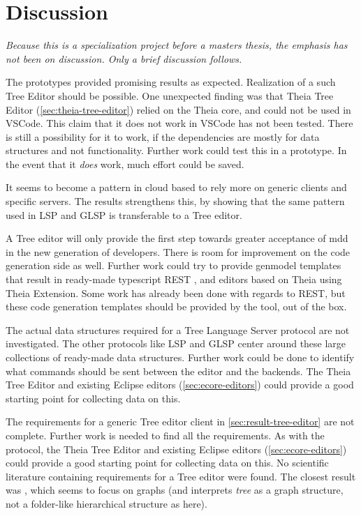 \chapter{Discussion}


\emph{Because this is a specialization project before a masters thesis, the emphasis has not been on discussion. Only a brief discussion follows.}

\par
The prototypes provided promising results as expected.
Realization of a such Tree Editor should be possible.
One unexpected finding was that Theia Tree Editor (\cref{sec:theia-tree-editor}) relied on the Theia core, and could not be used in VSCode.
This claim that it does not work in VSCode has not been tested.
There is still a possibility for it to work, if the dependencies are mostly for data structures and not functionality.
Further work could test this in a prototype.
In the event that it \emph{does} work, much effort could be saved.

\par
It seems to become a pattern in \gls{cloud} based  to rely more on generic clients and specific servers.
The results strengthens this, by showing that the same pattern used in \gls{LSP} and \gls{GLSP} is transferable to a Tree editor.

\par
A Tree editor will only provide the first step towards greater acceptance of \gls{mdd} in the new generation of developers.
There is room for improvement on the code generation side as well.
Further work could try to provide genmodel templates that result in ready-made typescript \gls{REST} , and editors based on Theia using Theia Extension.
Some work has already been done with regards to \gls{REST}, but these code generation templates should be provided by the tool, out of the box.

\par
The actual data structures required for a Tree Language Server protocol are not investigated.
The other protocols like \gls{LSP} and \gls{GLSP} center around these large collections of ready-made data structures.
Further work could be done to identify what commands should be sent between the editor and the backends.
The Theia Tree Editor and existing \gls{Eclipse} editors (\cref{sec:ecore-editors}) could provide a good starting point for collecting data on this.

\par
The requirements for a generic Tree editor client in \cref{sec:result-tree-editor} are not complete.
Further work is needed to find all the requirements.
As with the protocol, the Theia Tree Editor and existing \gls{Eclipse} editors (\cref{sec:ecore-editors}) could provide a good starting point for collecting data on this.
No scientific literature containing requirements for a Tree editor were found.
The closest result was \textcite{karrerRequirementsExtensibleObjectoriented1990}, which seems to focus on graphs (and interprets \emph{tree} as a graph structure, not a folder-like hierarchical structure as here).
